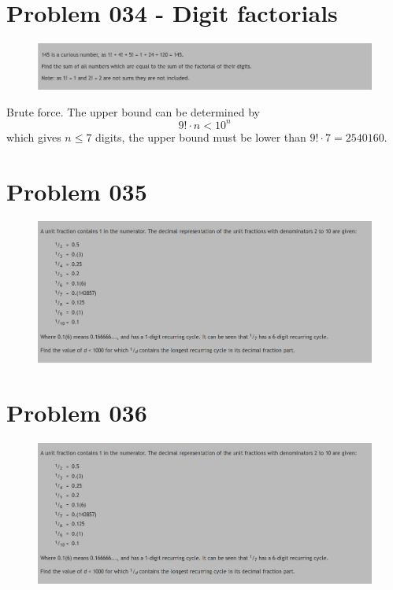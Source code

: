 \section{Problem 034 - Digit factorials}
\begin{prob}
	\begin{figure}[htb!]
		\begin{center}
			\includegraphics[scale = 0.4]{pic/034.png}
		\end{center}
	\end{figure}
\end{prob}
\begin{sol}
Brute force. The upper bound can be determined by 
$$9! \cdot n < 10^{n}$$
which gives $n \le 7$ digits, the upper bound must be lower than $9! \cdot 7 = 2540160$. 
\end{sol}

\section{Problem 035}
\begin{prob}
	\begin{figure}[htb!]
		\begin{center}
			\includegraphics[scale = 0.4]{pic/026.png}
		\end{center}
	\end{figure}
\end{prob}
\section{Problem 036}
\begin{prob}
	\begin{figure}[htb!]
		\begin{center}
			\includegraphics[scale = 0.4]{pic/026.png}
		\end{center}
	\end{figure}
\end{prob}
